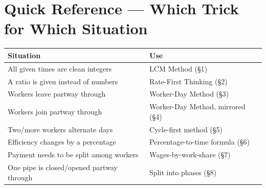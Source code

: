 \documentclass[11pt]{article}
\begin{document}
\section{Quick Reference --- Which Trick for Which Situation}
\begin{formulabox}
\centering
\begin{tabular}{ll}
\toprule
\textbf{Situation} & \textbf{Use} \\
\midrule
All given times are clean integers & LCM Method (\S1) \\
A ratio is given instead of numbers & Rate-First Thinking (\S2) \\
Workers leave partway through & Worker-Day Method (\S3) \\
Workers join partway through & Worker-Day Method, mirrored (\S4) \\
Two/more workers alternate days & Cycle-first method (\S5) \\
Efficiency changes by a percentage & Percentage-to-time formula (\S6) \\
Payment needs to be split among workers & Wages-by-work-share (\S7) \\
One pipe is closed/opened partway through & Split into phases (\S8) \\
\bottomrule
\end{tabular}
\end{formulabox}
\end{document}
